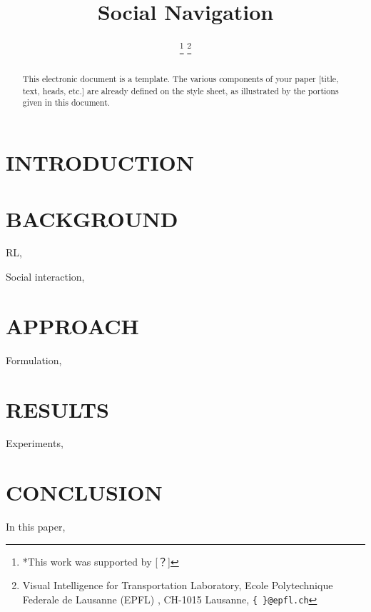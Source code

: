 \documentclass[letterpaper, 10 pt, conference]{ieeeconf}  %
\title{\Large \bf
Social Navigation}
\author{%
\thanks{*This work was supported by [？]}%
\thanks{Visual Intelligence for Transportation Laboratory, Ecole Polytechnique Federale de Lausanne (EPFL)
, CH-1015 Lausanne,
        {\tt\small \{ \}@epfl.ch}}%
}
\begin{document}

\maketitle
\thispagestyle{empty}
\pagestyle{empty}

\begin{abstract}
This electronic document is a template. The various components of your paper [title, text, heads, etc.] are already defined on the style sheet, as illustrated by the portions given in this document.

\end{abstract}


\section{INTRODUCTION} \label{sec:intro}

\vspace{10cm}

\section{BACKGROUND} \label{sec:background} 

RL, 

Social interaction, 

\section{APPROACH} \label{sec:approach} 

Formulation, 

\section{RESULTS} \label{sec:results} 

Experiments, 

\section{CONCLUSION} \label{sec:conclusion} 

In this paper, 

\end{document}
